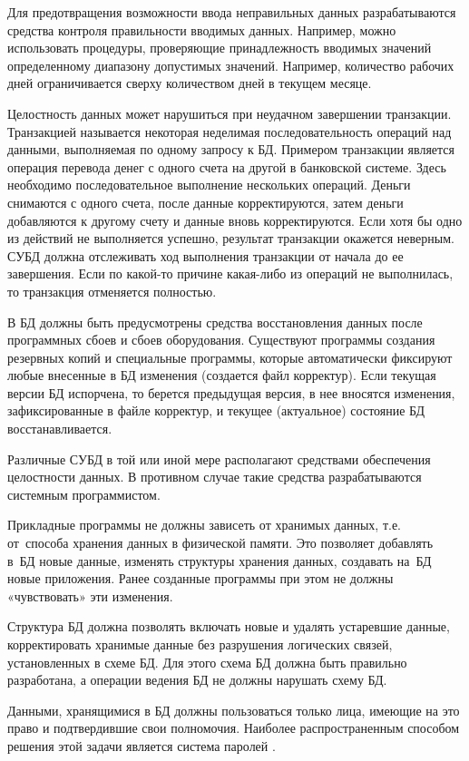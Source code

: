 \documentclass{ou}
\begin{document}
Для предотвращения возможности ввода неправильных данных разрабатываются средства контроля правильности вводимых данных. Например, можно использовать процедуры, проверяющие принадлежность вводимых значений определенному диапазону допустимых значений. Например, количество рабочих дней ограничивается сверху количеством дней в текущем месяце.

Целостность данных может нарушиться при неудачном завершении транзакции. Транзакцией называется некоторая неделимая последовательность операций над данными, выполняемая по одному запросу к БД. Примером транзакции является операция перевода денег с одного счета на другой в банковской системе. Здесь необходимо последовательное выполнение нескольких операций. Деньги снимаются с одного счета, после данные корректируются, затем деньги добавляются к другому счету и данные вновь корректируются. Если хотя бы одно из действий не выполняется успешно, результат транзакции окажется неверным. СУБД должна отслеживать ход выполнения транзакции от начала до ее завершения. Если по какой-то причине какая-либо из операций не выполнилась, то транзакция отменяется полностью. 

В БД должны быть предусмотрены средства восстановления данных после программных сбоев и сбоев оборудования. Существуют программы создания резервных копий и специальные программы, которые автоматически фиксируют любые внесенные в БД изменения (создается файл корректур). Если текущая версии БД испорчена, то берется предыдущая версия, в нее вносятся изменения, зафиксированные в файле корректур, и текущее (актуальное) состояние БД восстанавливается\cite{Karpova2013}. 

Различные СУБД в той или иной мере располагают средствами обеспечения целостности данных. В противном случае такие средства разрабатываются системным программистом.

Прикладные программы не должны зависеть от хранимых данных, т.е. от~способа хранения данных в физической памяти. Это позволяет добавлять в~БД новые данные, изменять структуры хранения данных, создавать на~БД новые приложения. Ранее созданные программы при этом не должны «чувствовать» эти изменения.  

Структура БД должна позволять включать новые и удалять устаревшие данные, корректировать хранимые данные без разрушения логических связей, установленных в схеме БД. Для этого схема БД должна быть правильно разработана, а операции ведения БД не должны нарушать схему БД.

Данными, хранящимися в БД должны пользоваться только лица, имеющие на это право и подтвердившие свои полномочия. Наиболее распространенным способом решения этой задачи является система паролей \cite{Sergeev2012}.
\end{document}
